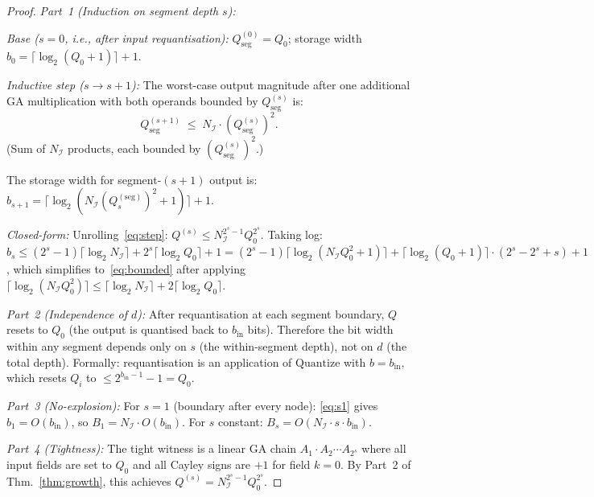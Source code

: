 \documentclass[11pt,a4paper]{article}
\theoremstyle{definition}
\theoremstyle{plain}
\theoremstyle{remark}
\newcommand{\Quantize}{\mathrm{Quantize}}
\begin{document}
\begin{proof}
\textit{Part~1 (Induction on segment depth $s$):}

\emph{Base ($s=0$, i.e., after input requantisation):}
$Q^{(0)}_\mathrm{seg}=Q_0$; storage width $b_0=\lceil\log_2(Q_0+1)\rceil+1$.

\emph{Inductive step ($s\to s+1$):}
The worst-case output magnitude after one additional GA multiplication
with both operands bounded by $Q^{(s)}_\mathrm{seg}$ is:
\begin{equation}\label{eq:step}
  Q^{(s+1)}_\mathrm{seg} \;\le\; N_\mathcal{I}\cdot (Q^{(s)}_\mathrm{seg})^2.
\end{equation}
(Sum of $N_\mathcal{I}$ products, each bounded by $(Q^{(s)}_\mathrm{seg})^2$.)

The storage width for segment-$(s+1)$ output is:
$b_{s+1} = \lceil\log_2(N_\mathcal{I}(Q_s^{(\mathrm{seg})})^2+1)\rceil+1$.

\emph{Closed-form:}
Unrolling~\eqref{eq:step}: $Q^{(s)}\le N_\mathcal{I}^{2^s-1}Q_0^{2^s}$.
Taking log: $b_s\le(2^s-1)\lceil\log_2 N_\mathcal{I}\rceil + 2^s\lceil\log_2 Q_0\rceil+1
             =(2^s-1)\lceil\log_2(N_\mathcal{I}Q_0^2+1)\rceil+\lceil\log_2(Q_0+1)\rceil\cdot(2^s-2^s+s)+1$,
which simplifies to~\eqref{eq:bounded} after applying $\lceil\log_2(N_\mathcal{I}Q_0^2)\rceil
\le\lceil\log_2 N_\mathcal{I}\rceil+2\lceil\log_2 Q_0\rceil$.

\textit{Part~2 (Independence of $d$):}
After requantisation at each segment boundary,
$Q$ resets to $Q_0$ (the output is quantised back to $b_{\text{in}}$ bits).
Therefore the bit width within any segment depends only on $s$
(the within-segment depth), not on $d$ (the total depth).
Formally: requantisation is an application of $\Quantize$ with
$b=b_{\text{in}}$, which resets $Q_i$ to $\le 2^{b_{\text{in}}-1}-1=Q_0$.

\textit{Part~3 (No-explosion):}
For $s=1$ (boundary after every node): \eqref{eq:s1} gives
$b_1 = O(b_{\text{in}})$, so $B_1 = N_\mathcal{I}\cdot O(b_{\text{in}})$.
For $s$ constant: $B_s = O(N_\mathcal{I}\cdot s\cdot b_{\text{in}})$.

\textit{Part~4 (Tightness):}
The tight witness is a linear GA chain $A_1\cdot A_2\cdots A_{2^s}$
where all input fields are set to $Q_0$ and all Cayley signs are $+1$
for field $k=0$.
By Part~2 of Thm.~\ref{thm:growth}, this achieves $Q^{(s)}=N_\mathcal{I}^{2^s-1}Q_0^{2^s}$.
\end{proof}
\end{document}
